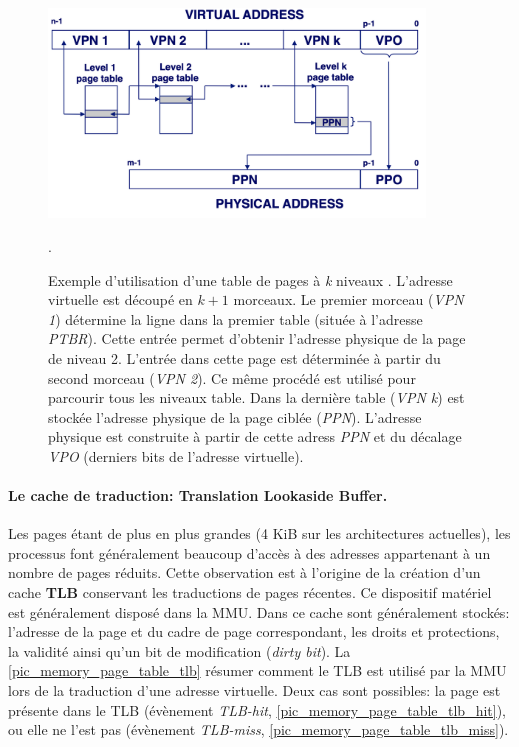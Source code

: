 \begin{figure}
    \center
    \includegraphics[width=10cm]{images/memory_page_table_multi2.png}
    \caption{\label{pic:memory_page_table_multi} Exemple d'utilisation d'une table de pages à \textit{k} niveaux \cite{Mowry2012}. L'adresse virtuelle est découpé en $k+1$ morceaux. Le premier morceau (\textit{VPN 1}) détermine la ligne dans la premier table (située à l'adresse \textit{PTBR}). Cette entrée permet d'obtenir l'adresse physique de la page de niveau 2. L'entrée dans cette page est déterminée à partir du second morceau (\textit{VPN 2}). Ce même procédé est utilisé pour parcourir tous les niveaux table. Dans la dernière table (\textit{VPN k}) est stockée l'adresse physique de la page ciblée (\textit{PPN}). L'adresse physique est construite à partir de cette adress \textit{PPN} et du décalage \textit{VPO} (derniers bits de l'adresse virtuelle).  }.
\end{figure}



\paragraph{Le cache de traduction: Translation Lookaside Buffer.} \label{sec:tlb}
Les pages étant de plus en plus grandes (4 KiB sur les architectures actuelles), les processus font généralement beaucoup d'accès à des adresses appartenant à un nombre de pages réduits. Cette observation est à l'origine de la création d'un cache \textbf{TLB} conservant les traductions de pages récentes. Ce dispositif matériel est généralement disposé dans la MMU. Dans ce cache sont généralement stockés: l'adresse de la page et du cadre de  page correspondant, les droits et protections, la validité ainsi qu'un bit de modification (\textit{dirty bit}). 
La \autoref{pic_memory_page_table_tlb} résumer comment le TLB est utilisé par la MMU lors de la traduction d'une adresse virtuelle. Deux cas sont possibles: la page est présente dans le TLB (évènement \textit{TLB-hit}, \autoref{pic_memory_page_table_tlb_hit}), ou elle ne l'est pas (évènement \textit{TLB-miss}, \autoref{pic_memory_page_table_tlb_miss}).


